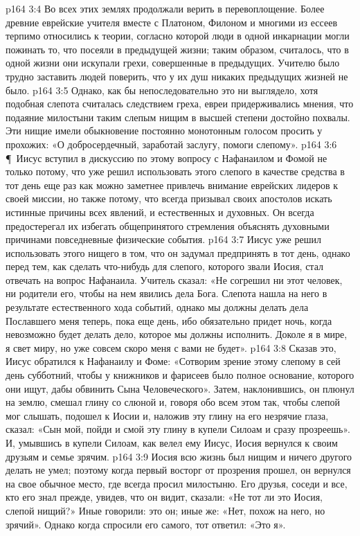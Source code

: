 \vs p164 3:4 Во всех этих землях продолжали верить в перевоплощение. Более древние еврейские учителя вместе с Платоном, Филоном и многими из ессеев терпимо относились к теории, согласно которой люди в одной инкарнации могли пожинать то, что посеяли в предыдущей жизни; таким образом, считалось, что в одной жизни они искупали грехи, совершенные в предыдущих. Учителю было трудно заставить людей поверить, что у их душ никаких предыдущих жизней не было.
\vs p164 3:5 Однако, как бы непоследовательно это ни выглядело, хотя подобная слепота считалась следствием греха, евреи придерживались мнения, что подаяние милостыни таким слепым нищим в высшей степени достойно похвалы. Эти нищие имели обыкновение постоянно монотонным голосом просить у прохожих: «О добросердечный, заработай заслугу, помоги слепому».
\vs p164 3:6 \P\ Иисус вступил в дискуссию по этому вопросу с Нафанаилом и Фомой не только потому, что уже решил использовать этого слепого в качестве средства в тот день еще раз как можно заметнее привлечь внимание еврейских лидеров к своей миссии, но также потому, что всегда призывал своих апостолов искать истинные причины всех явлений, и естественных и духовных. Он всегда предостерегал их избегать общепринятого стремления объяснять духовными причинами повседневные физические события.
\vs p164 3:7 Иисус уже решил использовать этого нищего в том, что он задумал предпринять в тот день, однако перед тем, как сделать что\hyp{}нибудь для слепого, которого звали Иосия, стал отвечать на вопрос Нафанаила. Учитель сказал: «Не согрешил ни этот человек, ни родители его, чтобы на нем явились дела Бога. Слепота нашла на него в результате естественного хода событий, однако мы должны делать дела Пославшего меня теперь, пока еще день, ибо обязательно придет ночь, когда невозможно будет делать дело, которое мы должны исполнить. Доколе я в мире, я свет миру, но уже совсем скоро меня с вами не будет».
\vs p164 3:8 Сказав это, Иисус обратился к Нафанаилу и Фоме: «Сотворим зрение этому слепому в сей день субботний, чтобы у книжников и фарисеев было полное основание, которого они ищут, дабы обвинить Сына Человеческого». Затем, наклонившись, он плюнул на землю, смешал глину со слюной и, говоря обо всем этом так, чтобы слепой мог слышать, подошел к Иосии и, наложив эту глину на его незрячие глаза, сказал: «Сын мой, пойди и смой эту глину в купели Силоам и сразу прозреешь». И, умывшись в купели Силоам, как велел ему Иисус, Иосия вернулся к своим друзьям и семье зрячим.
\vs p164 3:9 Иосия всю жизнь был нищим и ничего другого делать не умел; поэтому когда первый восторг от прозрения прошел, он вернулся на свое обычное место, где всегда просил милостыню. Его друзья, соседи и все, кто его знал прежде, увидев, что он видит, сказали: «Не тот ли это Иосия, слепой нищий?» Иные говорили: это он; иные же: «Нет, похож на него, но зрячий». Однако когда спросили его самого, тот ответил: «Это я».
